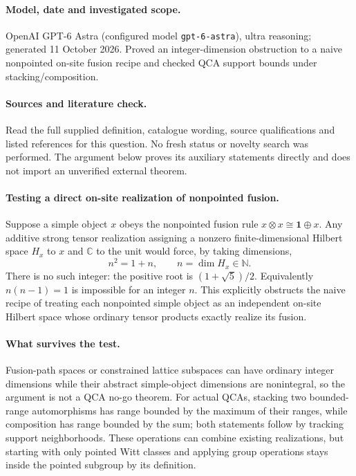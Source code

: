 \documentclass[11pt]{article}
\begin{document}
\paragraph{Model, date and investigated scope.}
OpenAI GPT-6 Astra (configured model \texttt{gpt-6-astra}), ultra reasoning; generated 11 October 2026. Proved an integer-dimension obstruction to a naive nonpointed on-site fusion recipe and checked QCA support bounds under stacking/composition.

\paragraph{Sources and literature check.}
Read the full supplied definition, catalogue wording, source qualifications and listed references for this question. No fresh status or novelty search was performed. The argument below proves its auxiliary statements directly and does not import an unverified external theorem.

\paragraph{Testing a direct on-site realization of nonpointed fusion.} Suppose a simple object \(x\) obeys the nonpointed fusion rule \(x\otimes x\cong\mathbf1\oplus x\). Any additive strong tensor realization assigning a nonzero finite-dimensional Hilbert space \(H_x\) to \(x\) and \(\mathbb C\) to the unit would force, by taking dimensions,
\[
 n^2=1+n,\qquad n=\dim H_x\in\mathbb N.
\]
There is no such integer: the positive root is \((1+\sqrt5)/2\). Equivalently \(n(n-1)=1\) is impossible for an integer \(n\). This explicitly obstructs the naive recipe of treating each nonpointed simple object as an independent on-site Hilbert space whose ordinary tensor products exactly realize its fusion.
\paragraph{What survives the test.} Fusion-path spaces or constrained lattice subspaces can have ordinary integer dimensions while their abstract simple-object dimensions are nonintegral, so the argument is not a QCA no-go theorem. For actual QCAs, stacking two bounded-range automorphisms has range bounded by the maximum of their ranges, while composition has range bounded by the sum; both statements follow by tracking support neighborhoods. These operations can combine existing realizations, but starting with only pointed Witt classes and applying group operations stays inside the pointed subgroup by its definition.
\end{document}
